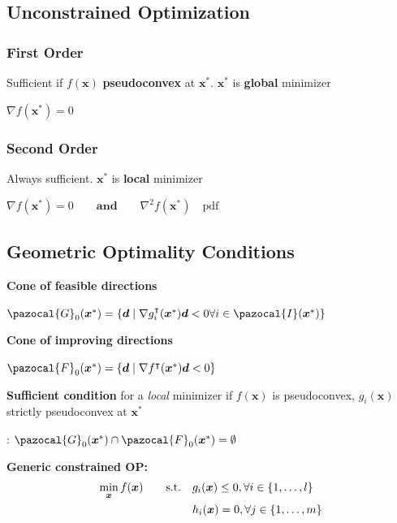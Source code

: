 \documentclass[english]{latex4ei/latex4ei_sheet}
\begin{document}
\begin{sectionbox}
	\subsection{Unconstrained Optimization}
	\subsubsection{First Order}
	Sufficient if $f(\bm{x})$ \textbf{pseudoconvex} at $\bm{x}^*$. $\bm{x}^*$ is \textbf{global} minimizer
	\begin{center}
		$\nabla f(\bm{x}^*) = 0$
	\end{center}
	\vspace{0.5em}
	\subsubsection{Second Order}
	Always sufficient. $\bm{x}^*$ is \textbf{local} minimizer
	\begin{center}
		$\nabla f(\bm{x}^*) = 0 \qquad \textbf{and} \qquad \nabla^2 f(\bm{x}^*) \quad \text{pdf}$
	\end{center}
\end{sectionbox}

\begin{sectionbox}
	\subsection{Geometric Optimality Conditions}
	\vspace{0.3em}
	\textbf{Cone of feasible directions}
	\begin{center}
		$\pazocal{G}_0(\bm{x}^*) = \{\bm{d} \mid \nabla g_i^\intercal(\bm{x}^*)\bm{d} < 0 \forall i \in \pazocal{I}(\bm{x}^*) \}$
	\end{center}
	\textbf{Cone of improving directions}
	\begin{center}
		$\pazocal{F}_0(\bm{x}^*) = \{\bm{d} \mid \nabla f^\intercal(\bm{x}^*)\bm{d} < 0 \}$
	\end{center}
	\textbf{Sufficient condition} for a \textit{local} minimizer if $f(\bm{x})$ is pseudoconvex, $g_i(\bm{x})$ strictly pseudoconvex at $\bm{x}^*$
	\begin{center}:
		$\pazocal{G}_0(\bm{x}^*) \cap \pazocal{F}_0(\bm{x}^*) = \emptyset$
	\end{center}
	\vspace{1em}
\end{sectionbox}

\begin{emphbox}
	\textbf{Generic constrained OP:}
	\begin{align}
		\min_{\bm{x}} f(\bm{x}) \qquad \text{s.t.} \quad & g_i(\bm{x}) \leq 0, \forall i \in \{1, \dots, l\} \notag\\
		& h_i(\bm{x}) = 0, \forall j \in \{1, \dots, m\} \notag
	\end{align}
\end{emphbox}
\end{document}
